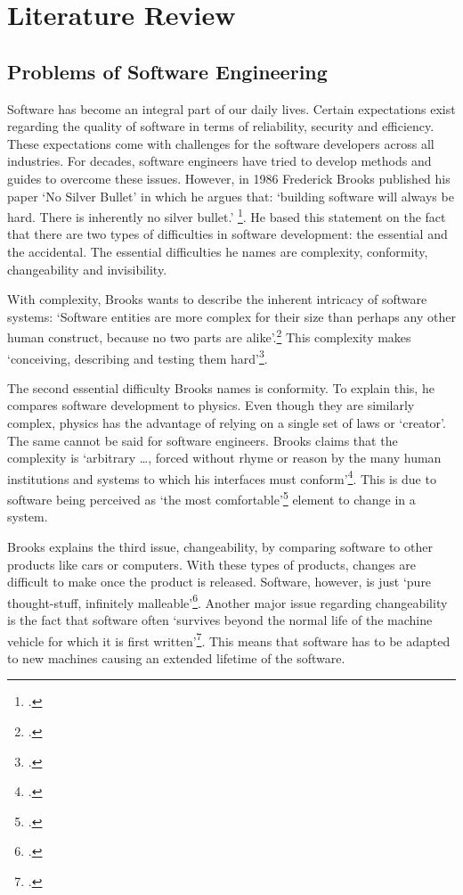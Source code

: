 \section{Literature Review}
\subsection{Problems of Software Engineering}
Software has become an integral part of our daily lives. Certain expectations exist regarding the quality of software in terms of reliability, security and efficiency. These expectations come with challenges for the software developers across all industries.
For decades, software engineers have tried to develop methods and guides to overcome these issues. However, in 1986 Frederick Brooks published his paper `No Silver Bullet'
in which he argues that: `building software will always be hard. There is inherently no silver bullet.' \footcite[3]{brooksNoSilverBullet1987}. He based this statement on the fact that there are two types of difficulties in software development: the essential and the accidental.
The essential difficulties he names are complexity, conformity, changeability and invisibility.

With complexity, Brooks wants to describe the inherent intricacy of software systems: `Software entities are more complex for their size than perhaps any other human construct, because no two parts are alike'.\footcite[3]{brooksNoSilverBullet1987}
This complexity makes `conceiving, describing and testing them hard'\footcite[3]{brooksNoSilverBullet1987}.

The second essential difficulty Brooks names is conformity. To explain this, he compares software development to physics. Even though they are similarly complex, physics has the advantage of relying on a single set of laws or `creator'. The same cannot be said for software engineers. Brooks claims that
the complexity is `arbitrary \ldots, forced without rhyme or reason by the many human institutions and systems to which his interfaces must conform'\footcite[4]{brooksNoSilverBullet1987}. This is due to software being perceived as `the most comfortable'\footcite[4]{brooksNoSilverBullet1987} element to change in a system.

Brooks explains the third issue, changeability, by comparing software to other products like cars or computers. With these types of products, changes are difficult to make once the product is released. Software, however, is just `pure thought-stuff, infinitely malleable'\footcite[4]{brooksNoSilverBullet1987}. Another major issue regarding changeability is
the fact that software often `survives beyond the normal life of the machine vehicle for which it is first written'\footcite[4]{brooksNoSilverBullet1987}. This means that software has to be adapted to new machines causing an extended lifetime of the software.

